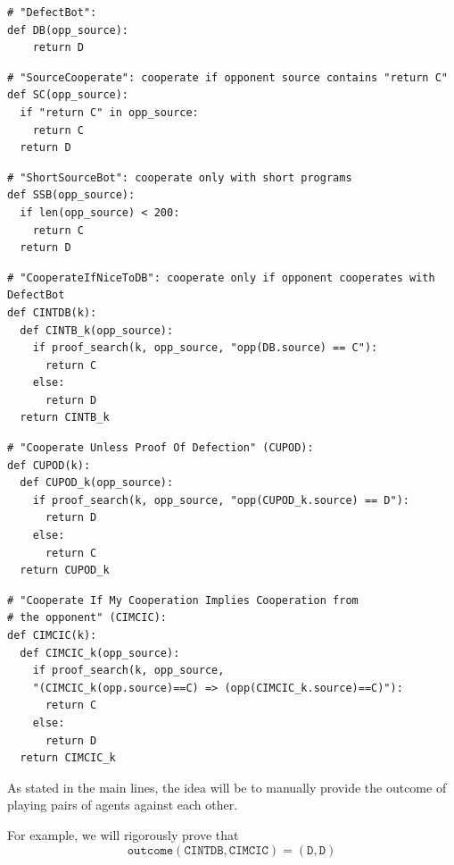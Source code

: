 \documentclass{article}
\begin{document}
\begin{verbatim}
# "DefectBot":
def DB(opp_source):
    return D
\end{verbatim}

\begin{verbatim}
# "SourceCooperate": cooperate if opponent source contains "return C"
def SC(opp_source):
  if "return C" in opp_source:
    return C
  return D
\end{verbatim}

\begin{verbatim}
# "ShortSourceBot": cooperate only with short programs
def SSB(opp_source):
  if len(opp_source) < 200:
    return C
  return D
\end{verbatim}

\begin{verbatim}
# "CooperateIfNiceToDB": cooperate only if opponent cooperates with DefectBot
def CINTDB(k):
  def CINTB_k(opp_source):
    if proof_search(k, opp_source, "opp(DB.source) == C"):
      return C
    else:
      return D
  return CINTB_k
\end{verbatim}

\newcommand{\cupod}{\Verb{CUPOD(k)}\xspace}
\begin{verbatim}
# "Cooperate Unless Proof Of Defection" (CUPOD):
def CUPOD(k):
  def CUPOD_k(opp_source):
    if proof_search(k, opp_source, "opp(CUPOD_k.source) == D"):
      return D
    else:
      return C
  return CUPOD_k
\end{verbatim}

\begin{verbatim}
# "Cooperate If My Cooperation Implies Cooperation from
# the opponent" (CIMCIC):
def CIMCIC(k):
  def CIMCIC_k(opp_source):
    if proof_search(k, opp_source,
    "(CIMCIC_k(opp.source)==C) => (opp(CIMCIC_k.source)==C)"):
      return C
    else:
      return D
  return CIMCIC_k
\end{verbatim} 

As stated in the main lines, the idea will be to manually provide the outcome of playing pairs of agents against each other.

For example, we will rigorously prove that \[
\texttt{outcome}(\texttt{CINTDB}, \texttt{CIMCIC}) = (\texttt{D}, \texttt{D})
\]

\printbibliography
\end{document}
